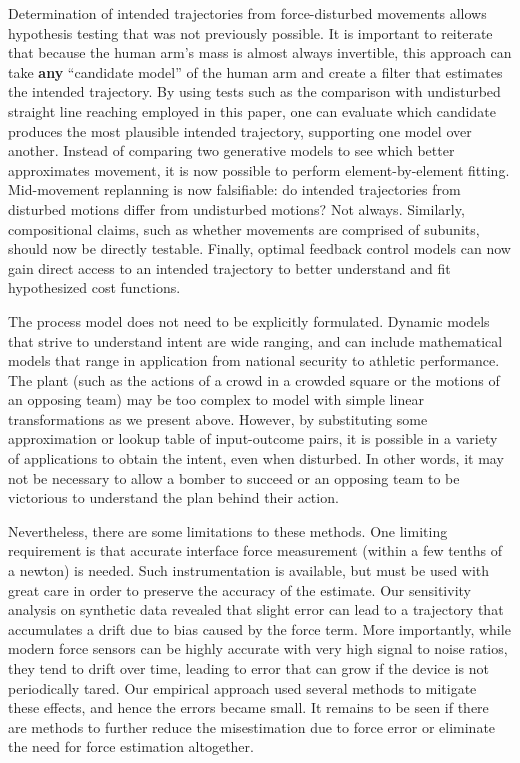 \documentclass[10pt]{article}
\begin{document}
Determination of intended trajectories from force-disturbed movements allows hypothesis testing that was not previously possible. It is important to reiterate that because the human arm's mass is almost always invertible, this approach can take \textbf{any} ``candidate model'' of the human arm and create a filter that estimates the intended trajectory. By using tests such as the comparison with undisturbed straight line reaching employed in this paper, one can evaluate which candidate produces the most plausible intended trajectory, supporting one model over another.  Instead of comparing two generative models to see which better approximates movement, it is now possible to perform element-by-element fitting. Mid-movement replanning is now falsifiable: do intended trajectories from disturbed motions differ from undisturbed motions? Not always. Similarly, compositional claims, such as whether movements are comprised of subunits, should now be directly testable. Finally, optimal feedback control models can now gain direct access to an intended trajectory to better understand and fit hypothesized cost functions.

The process model does not need to be explicitly formulated. Dynamic models that strive to understand intent are wide ranging, and can include mathematical models that range in application from national security to athletic performance. The plant (such as the actions of a crowd in a crowded square or the motions of an opposing team) may be too complex to model with simple linear transformations as we present above. However, by substituting some approximation or lookup table of input-outcome pairs, it is possible in a variety of applications to obtain the intent, even when disturbed. In other words, it may not be necessary to allow a bomber to succeed or an opposing team to be victorious to understand the plan behind their action.

Nevertheless, there are some limitations to these methods.  One limiting requirement is that accurate interface force measurement (within a few tenths of a newton) is needed. Such instrumentation is available, but must be used with great care in order to preserve the accuracy of the estimate. Our sensitivity analysis on synthetic data revealed that slight error can lead to a trajectory that accumulates a drift due to bias caused by the force term. More importantly, while modern force sensors can be highly accurate with very high signal to noise ratios, they tend to drift over time, leading to error that can grow if the device is not periodically tared. Our empirical approach used several methods to mitigate these effects, and hence the errors became small. It remains to be seen if there are methods to further reduce the misestimation due to force error or eliminate the need for force estimation altogether.  
\end{document}
